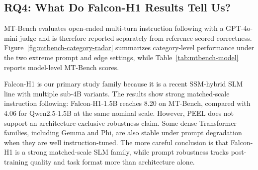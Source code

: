 \documentclass[letterpaper]{article} %
\begin{document}
\subsection{RQ4: What Do Falcon-H1 Results Tell Us?}
\label{sec:open-ended-results}

MT-Bench evaluates open-ended multi-turn instruction following with a
GPT-4o-mini judge and is therefore reported separately from reference-scored
correctness. Figure~\ref{fig:mtbench-category-radar} summarizes category-level
performance under the two extreme prompt and edge settings, while
Table~\ref{tab:mtbench-model} reports model-level MT-Bench scores.

Falcon-H1 is our primary study family because it is a recent SSM-hybrid SLM
line with multiple sub-4B variants. The results show strong matched-scale
instruction following: Falcon-H1-1.5B reaches 8.20 on MT-Bench, compared with
4.06 for Qwen2.5-1.5B at the same nominal scale. However, PEEL does not support
an architecture-exclusive robustness claim. Some dense Transformer families,
including Gemma and Phi, are also stable under prompt degradation when they are
well instruction-tuned. The more careful conclusion is that Falcon-H1 is a
strong matched-scale SLM family, while prompt robustness tracks post-training
quality and task format more than architecture alone.
\end{document}
